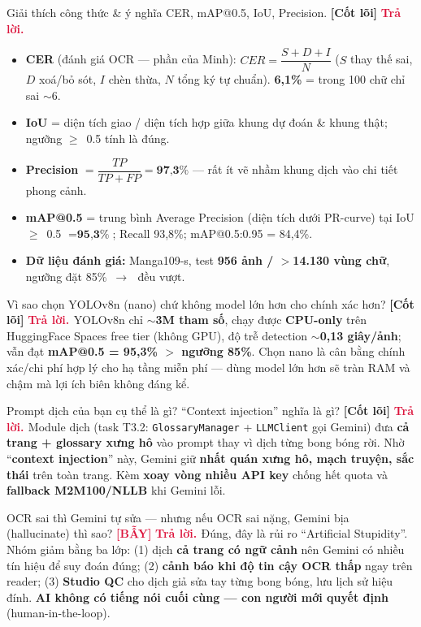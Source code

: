 \documentclass[11pt]{article}
\newcommand{\arr}{\,\ensuremath{\rightarrow}\,}
\newcommand{\gte}{\ensuremath{\geq}}
\newcommand{\code}[1]{\texttt{\small #1}}
\newcommand{\tagCore}{\textcolor{steel}{\footnotesize\textbf{[Cốt lõi]}}}
\newcommand{\tagTrap}{\textcolor{crimson}{\footnotesize\textbf{[BẪY]}}}
\newcommand{\A}{\textbf{\textcolor{crimson}{Trả lời. }}}
\begin{document}
\begin{qa}{Giải thích công thức \& ý nghĩa CER, mAP@0.5, IoU, Precision. \tagCore}
\A
\begin{itemize}
  \item \textbf{CER} (đánh giá OCR --- phần của Minh): $CER = \dfrac{S+D+I}{N}$ ($S$ thay thế sai, $D$ xoá/bỏ sót, $I$ chèn thừa, $N$ tổng ký tự chuẩn). \textbf{6,1\%} = trong 100 chữ chỉ sai $\sim$6.
  \item \textbf{IoU} = diện tích giao / diện tích hợp giữa khung dự đoán \& khung thật; ngưỡng \gte\ 0.5 tính là đúng.
  \item \textbf{Precision} $= \dfrac{TP}{TP+FP} = \textbf{97,3\%}$ --- rất ít vẽ nhầm khung dịch vào chi tiết phong cảnh.
  \item \textbf{mAP@0.5} = trung bình Average Precision (diện tích dưới PR-curve) tại IoU \gte\ 0.5 $= \textbf{95,3\%}$; Recall 93,8\%; mAP@0.5:0.95 = 84,4\%.
  \item \textbf{Dữ liệu đánh giá:} Manga109-s, test \textbf{956 ảnh / $>$14.130 vùng chữ}, ngưỡng đặt 85\% \arr\ đều vượt.
\end{itemize}
\end{qa}

\begin{qa}{Vì sao chọn YOLOv8n (nano) chứ không model lớn hơn cho chính xác hơn? \tagCore}
\A YOLOv8n chỉ \textbf{$\sim$3M tham số}, chạy được \textbf{CPU-only} trên HuggingFace Spaces free tier (không GPU), độ trễ detection $\sim$\textbf{0,13 giây/ảnh}; vẫn đạt \textbf{mAP@0.5 = 95,3\% $>$ ngưỡng 85\%}. Chọn nano là cân bằng chính xác/chi phí hợp lý cho hạ tầng miễn phí --- dùng model lớn hơn sẽ tràn RAM và chậm mà lợi ích biên không đáng kể.
\end{qa}

\begin{qa}{Prompt dịch của bạn cụ thể là gì? ``Context injection'' nghĩa là gì? \tagCore}
\A Module dịch (task T3.2: \code{GlossaryManager} + \code{LLMClient} gọi Gemini) đưa \textbf{cả trang + glossary xưng hô} vào prompt thay vì dịch từng bong bóng rời. Nhờ ``\textbf{context injection}'' này, Gemini giữ \textbf{nhất quán xưng hô, mạch truyện, sắc thái} trên toàn trang. Kèm \textbf{xoay vòng nhiều API key} chống hết quota và \textbf{fallback M2M100/NLLB} khi Gemini lỗi.
\end{qa}

\begin{qa}{OCR sai thì Gemini tự sửa --- nhưng nếu OCR sai nặng, Gemini bịa (hallucinate) thì sao? \tagTrap}
\A Đúng, đây là rủi ro ``Artificial Stupidity''. Nhóm giảm bằng ba lớp: (1) dịch \textbf{cả trang có ngữ cảnh} nên Gemini có nhiều tín hiệu để suy đoán đúng; (2) \textbf{cảnh báo khi độ tin cậy OCR thấp} ngay trên reader; (3) \textbf{Studio QC} cho dịch giả sửa tay từng bong bóng, lưu lịch sử hiệu đính. \textbf{AI không có tiếng nói cuối cùng --- con người mới quyết định} (human-in-the-loop).
\end{qa}
\end{document}
